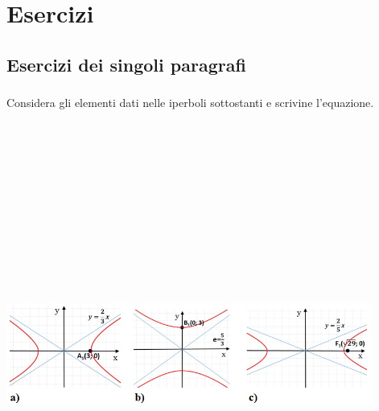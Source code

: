 
\section{Esercizi}

\subsection{Esercizi dei singoli paragrafi}

\subsubsection*{}

\begin{esercizio}
  \label{ese:div.003}
  Considera gli elementi dati nelle iperboli sottostanti e scrivine 
l'equazione.
  \centering%
  \includegraphics[height=16cm, width=12cm, keepaspectratio] 
{img/graficiip.jpg}%
\end{esercizio}

